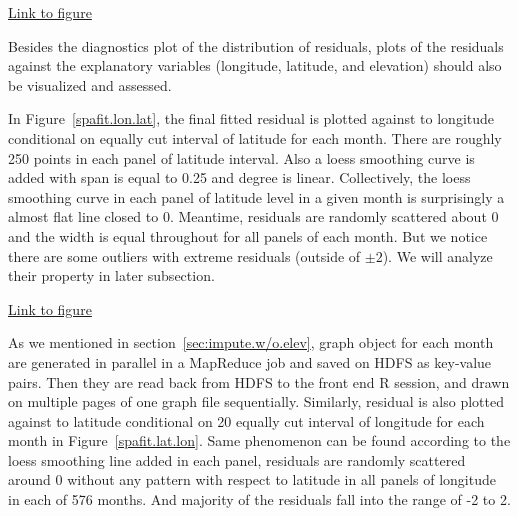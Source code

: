 \begin{framed}
\begin{center}
  \href{../plots/a1950/spafit/d2/span0.015/a1950.residual.QQ.pdf}
  {Link to figure}
  \label{spafit.qq}
\end{center}
\end{framed}

Besides the diagnostics plot of the distribution of residuals, plots of the 
residuals against the explanatory variables (longitude, latitude, and elevation)
should also be visualized and assessed.

In Figure~\href{../plots/a1950/spafit/d2/span0.015/a1950.spaResid.vs.lon.lat.pdf}
{\ref*{spafit.lon.lat}}, the final fitted residual is plotted against to longitude
conditional on equally cut interval of latitude for each month. There are roughly
250 points in each panel of latitude interval. Also a loess 
smoothing curve is added with span is equal to 0.25 and degree is linear. 
Collectively, the loess smoothing curve in each panel of latitude level in a given
month is surprisingly a almost flat line closed to 0. Meantime, residuals are
randomly scattered about 0 and the width is equal throughout for all panels of 
each month. But we notice there are some outliers with extreme residuals (outside
of $\pm 2$). We will analyze their property in later subsection.

\begin{framed}
\begin{center}
  \href{../plots/a1950/spafit/d2/span0.015/a1950.spaResid.vs.lon.lat.pdf}
  {Link to figure}
  \label{spafit.lon.lat}
\end{center}
\end{framed}

As we mentioned in section~\ref{sec:impute.w/o.elev}, graph object for each month 
are generated in parallel in a MapReduce job and saved on HDFS as key-value pairs. 
Then they are read back from HDFS to the front end R session, and drawn on multiple 
pages of one graph file sequentially. Similarly, residual is also plotted against 
to latitude conditional on 20 equally cut interval of longitude for each month 
in Figure~\href{../plots/a1950/spafit/d2/span0.015/a1950.spaResid.vs.lat.lon.pdf}
{\ref*{spafit.lat.lon}}. Same phenomenon can be found according to the loess 
smoothing line added in each panel, residuals are randomly scattered around 0 
without any pattern with respect to latitude in all panels of longitude in each 
of 576 months. And majority of the residuals fall into the range of -2 to 2.

